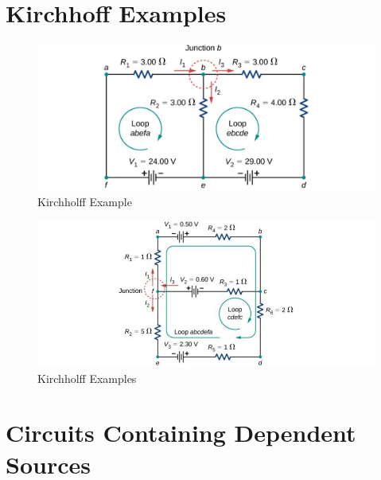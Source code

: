 \documentclass[14pt]{memoir}
\begin{document}
\section{Kirchhoff Examples}

\begin{figure}[H]
\begin{center}
\includegraphics[scale=0.50]{fig/fig_10_28.jpg}
\caption{Kirchholff Example}
\label{fig:10_28}
\end{center}
\end{figure}

\begin{figure}[H]
\begin{center}
\includegraphics[scale=0.50]{fig/fig_10_29.jpg}
\caption{Kirchholff Examples}
\label{fig:10_29}
\end{center}
\end{figure}

\section{Circuits Containing Dependent Sources}
\end{document}
